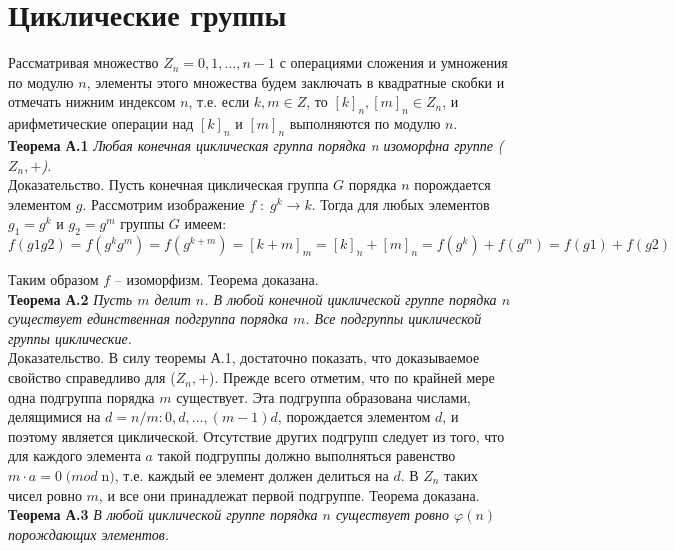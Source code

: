 \documentclass[10pt, a4paper]{scrartcl}
\numberwithin{equation}{section}
\begin{document}
	\tableofcontents 
	\newpage
	\section{Циклические группы}
	\noindent Рассматривая множество $Z_{n} = {0, 1, \ldots, n - 1}$ с операциями сложения и умножения по модулю $n$, элементы этого множества будем заключать в квадратные скобки и отмечать нижним индексом $n$, т.е. если $k, m \in Z$, то $[k]_{n},[m]_{n} \in Z_{n}$, и арифметические операции над $[k]_{n}$ и $[m]_{n}$ выполняются по модулю $n$.
	\\
	
	 \textbf{Теорема А.1} \textit{Любая конечная циклическая группа порядка n изоморфна группе ($Z_{n}, +$).}
	 \\
	 
	 Доказательство. Пусть конечная циклическая группа $G$ порядка $n$ порождается элементом $g$. Рассмотрим изображение $f \; : \; g^k \rightarrow k$. Тогда для любых элементов $g_{1} = g^k$ и $g_{2} = g^m$ группы $G$ имеем:
	 \begin{equation}
	  f(g1g2) = f(g^k g^m) = f(g^{k+m}) = [k+m]_{m} = [k]_{n} + [m]_{n} = f(g^k) + f(g^m) = f(g1) + f(g2)
	 \end{equation}
	 
	 Таким образом $f$ -- изоморфизм. Теорема доказана. 
	 \\
	 
	 \textbf{Теорема А.2} \textit{Пусть $m$ делит $n$. В любой конечной циклической группе порядка $n$ существует единственная подгруппа порядка $m$. Все подгруппы циклической группы циклические.}
	 \\
	 
	 Доказательство. В силу теоремы А.1, достаточно показать, что доказываемое свойство справедливо для ($Z_{n}, +$). Прежде всего отметим, что по крайней мере одна подгруппа порядка $m$ существует. Эта подгруппа образована числами, делящимися на $d = n/m:0,d, \ldots,(m-1)d$, порождается элементом $d$, и поэтому является циклической. Отсутствие других подгрупп следует из того, что для каждого элемента $a$ такой подгруппы должно выполняться равенство $m \cdot a = 0 \; (mod \; $n$)$, т.е. каждый ее элемент должен делиться на $d$. В $Z_{n}$ таких чисел ровно $m$, и все они принадлежат первой подгруппе. Теорема доказана. 
	 \\
	 
	 \textbf{Теорема А.3} \textit{В любой циклической группе порядка $n$ существует ровно $\varphi(n)$ порождающих элементов.} 
	 \\
	 
\end{document}
